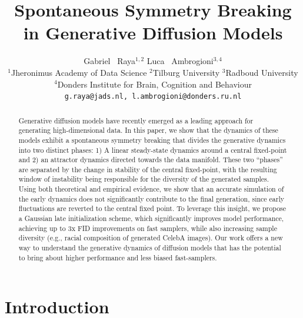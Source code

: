 \documentclass{article}
\title{Spontaneous Symmetry Breaking in Generative Diffusion Models}
\author{%
Gabriel ~Raya$^{1,2}$ \quad  Luca ~Ambrogioni$^{3,4}$ \\
$^1$Jheronimus Academy of Data Science \quad $^2$Tilburg University \quad $^3$Radboud University \\
$^4$Donders Institute for Brain, Cognition and Behaviour\\
\texttt{g.raya@jads.nl, l.ambrogioni@donders.ru.nl}\\
}
\begin{document}
\maketitle
 

\begin{abstract}
    Generative diffusion models have recently emerged as a leading approach for generating high-dimensional data. In this paper, we show that the dynamics of these models exhibit a spontaneous symmetry breaking that divides the generative dynamics into two distinct phases: 1) A linear steady-state dynamics around a central fixed-point and 2) an attractor dynamics directed towards the data manifold. These two ``phases'' are separated by the change in stability of the central fixed-point, with the resulting window of instability being responsible for the diversity of the generated samples. Using both theoretical and empirical evidence, we show that an accurate simulation of the early dynamics does not significantly contribute to the final generation, since early fluctuations are reverted to the central fixed point. To leverage this insight, we propose a Gaussian late initialization scheme, which significantly improves model performance, achieving up to 3x FID improvements on fast samplers, while also increasing sample diversity (e.g., racial composition of generated CelebA images). Our work offers a new way to understand the generative dynamics of diffusion models that has the potential to bring about higher performance and less biased fast-samplers.
\end{abstract}
\section{Introduction}
\end{document}
